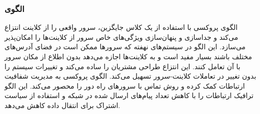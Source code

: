 \subsubsection{الگوی }
\label{distrProxySec}
\begin{RTL}
الگوی پروکسی \cite{ref4}
با استفاده از یک کلاس جایگزین، سرور واقعی را از کلاینت
انتزاع می‌کند و جداسازی و پنهان‌سازی ویژگی‌های خاص سرور
از کلاینت‌ها را امکان‌پذیر می‌سازد. این الگو در سیستم‌های نهفته که
سرورها ممکن است در فضای آدرس‌های مختلف باشند بسیار مفید است
و به کلاینت‌ها اجازه می‌دهد بدون اطلاع از مکان سرور با آن تعامل کنند.
این انتزاع طراحی مشتریان را ساده می‌کند و تغییرات سیستم را بدون تغییر
در تعاملات کلاینت-سرور تسهیل می‌کند. الگوی پروکسی به مدیریت شفافیت
ارتباطات کمک کرده و روش تماس با سرورهای راه دور را محصور می‌کند.
این الگو ترافیک ارتباطات را با کاهش تعداد پیام‌های ارسال شده
در شبکه و استفاده از سیاست اشتراک برای انتقال داده کاهش می‌دهد.
\end{RTL}